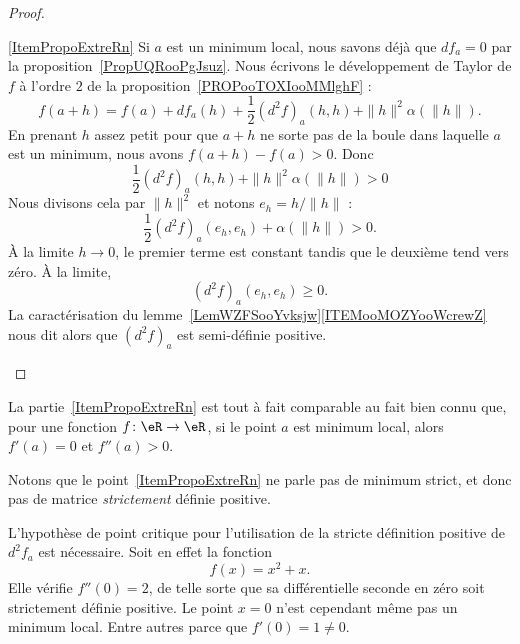 \begin{proof}
\begin{subproof}
    \item[\ref{ItemPropoExtreRn}]
    Si \( a\) est un minimum local, nous savons déjà que \( df_a=0\) par la proposition~\ref{PropUQRooPgJsuz}. Nous écrivons le développement de Taylor de \( f\) à l'ordre \( 2\) de la proposition~\ref{PROPooTOXIooMMlghF} :
    \begin{equation}
        f(a+h)=f(a)+df_a(h)+\frac{ 1 }{2}(d^2f)_a(h,h)+\| h \|^2\alpha(\| h \|).
    \end{equation}
    En prenant \( h\) assez petit pour que \( a+h\) ne sorte pas de la boule dans laquelle \( a\) est un minimum, nous avons \( f(a+h)-f(a)>0\). Donc
    \begin{equation}
        \frac{ 1 }{2}(d^2f)_a(h,h)+\| h \|^2\alpha(\| h \|)>0
    \end{equation}
    Nous divisons cela par \( \| h \|^2\) et notons \( e_h=h/\| h \|\) :
    \begin{equation}
        \frac{ 1 }{2}(d^2f)_a(e_h,e_h)+\alpha(\| h \|)>0.
    \end{equation}
    À la limite \( h\to 0\), le premier terme est constant tandis que le deuxième tend vers zéro. À la limite,
    \begin{equation}
        (d^2f)_a(e_h,e_h)\geq 0.
    \end{equation}
    La caractérisation du lemme~\ref{LemWZFSooYvksjw}\ref{ITEMooMOZYooWcrewZ} nous dit alors que \( (d^2f)_a\) est semi-définie positive.
    \end{subproof}
\end{proof}

La partie~\ref{ItemPropoExtreRn} est tout à fait comparable au fait bien connu que, pour une fonction $f\colon \eR\to \eR$, si le point $a$ est minimum local, alors $f'(a)=0$ et $f''(a)>0$.

Notons que le point~\ref{ItemPropoExtreRn} ne parle pas de minimum strict, et donc pas de matrice \emph{strictement} définie positive.

\begin{example}
    L'hypothèse de point critique pour l'utilisation de la stricte définition positive de \( d^2f_a\) est nécessaire. Soit en effet la fonction
    \begin{equation}
        f(x)=x^2+x.
    \end{equation}
    Elle vérifie \( f''(0)=2\), de telle sorte que sa différentielle seconde en zéro soit strictement définie positive. Le point \( x=0\) n'est cependant même pas un minimum local. Entre autres parce que \( f'(0)=1\neq 0\).
\end{example}

